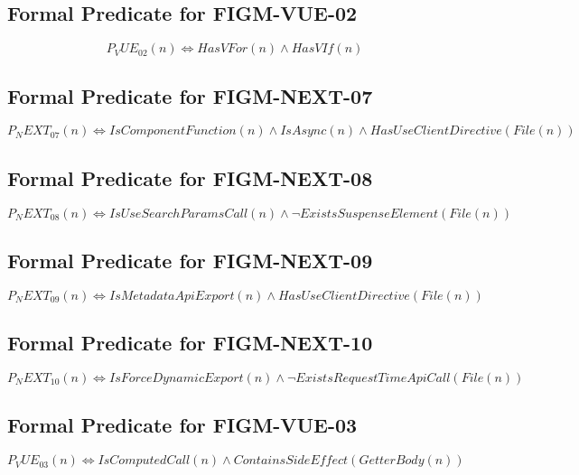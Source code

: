 \subsection{Formal Predicate for FIGM-VUE-02}
\begin{equation}
P_VUE_02(n) \iff HasVFor(n) \land HasVIf(n)
\end{equation}

\subsection{Formal Predicate for FIGM-NEXT-07}
\begin{equation}
P_NEXT_07(n) \iff IsComponentFunction(n) \land IsAsync(n) \land HasUseClientDirective(File(n))
\end{equation}

\subsection{Formal Predicate for FIGM-NEXT-08}
\begin{equation}
P_NEXT_08(n) \iff IsUseSearchParamsCall(n) \land \neg ExistsSuspenseElement(File(n))
\end{equation}

\subsection{Formal Predicate for FIGM-NEXT-09}
\begin{equation}
P_NEXT_09(n) \iff IsMetadataApiExport(n) \land HasUseClientDirective(File(n))
\end{equation}

\subsection{Formal Predicate for FIGM-NEXT-10}
\begin{equation}
P_NEXT_10(n) \iff IsForceDynamicExport(n) \land \neg ExistsRequestTimeApiCall(File(n))
\end{equation}

\subsection{Formal Predicate for FIGM-VUE-03}
\begin{equation}
P_VUE_03(n) \iff IsComputedCall(n) \land ContainsSideEffect(GetterBody(n))
\end{equation}

